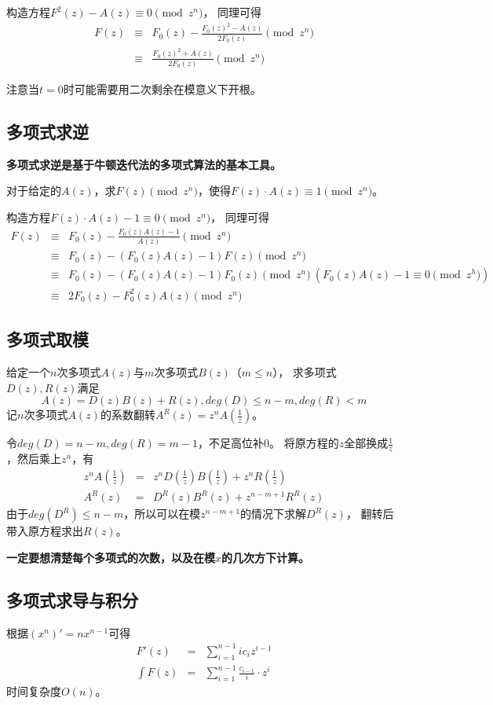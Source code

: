 构造方程$F^2(z)-A(z)\equiv 0\pmod{z^n}$，
同理可得
\begin{eqnarray*}
    F(z)&\equiv& F_0(z)-\frac{F_0(z)^2-A(z)}{2F_0(z)} \pmod{z^n}\\
    &\equiv& \frac{F_0(z)^2+A(z)}{2F_0(z)} \pmod{z^n}
\end{eqnarray*}

注意当$t=0$时可能需要用二次剩余在模意义下开根。

\subsection{多项式求逆}
{\bfseries 多项式求逆是基于牛顿迭代法的多项式算法的基本工具。}

对于给定的$A(z)$，求$F(z) \pmod{z^n}$，使得$F(z)\cdot A(z)\equiv 1\pmod{z^n}$。

构造方程$F(z)\cdot A(z)-1\equiv 0\pmod{z^n}$，
同理可得
\begin{eqnarray*}
    F(z)&\equiv& F_0(z)-\frac{F_0(z)A(z)-1}{A(z)} \pmod{z^n}\\
    &\equiv& F_0(z)-(F_0(z)A(z)-1){F(z)} \pmod{z^n}\\
    &\equiv& F_0(z)-(F_0(z)A(z)-1){F_0(z)} \pmod{z^n}~(F_0(z)A(z)-1\equiv 0\pmod{z^h})\\
    &\equiv& 2F_0(z)-F_0^2(z)A(z) \pmod{z^n}
\end{eqnarray*}
\subsection{多项式取模}
给定一个$n$次多项式$A(z)$与$m$次多项式$B(z)$（$m\leq n$），
求多项式$D(z),R(z)$满足
\begin{displaymath}
    A(z)=D(z)B(z)+R(z),deg(D)\leq n-m,deg(R)<m
\end{displaymath}
记$n$次多项式$A(z)$的系数翻转$A^R(z)=z^nA(\frac{1}{z})$。

令$deg(D)=n-m,deg(R)=m-1$，不足高位补0。
将原方程的$z$全部换成$\frac{1}{z}$，然后乘上$z^n$，有
\begin{eqnarray*}
    z^nA(\frac{1}{z})&=&z^nD(\frac{1}{z})B(\frac{1}{z})+z^nR(\frac{1}{z})\\
    A^R(z)&=&D^R(z)B^R(z)+z^{n-m+1}R^R(z)
\end{eqnarray*}
由于$deg(D^R)\leq n-m$，所以可以在模$z^{n-m+1}$的情况下求解$D^R(z)$，
翻转后带入原方程求出$R(z)$。

{\bfseries 一定要想清楚每个多项式的次数，以及在模$x$的几次方下计算。}
\subsection{多项式求导与积分}
根据$(x^n)'=nx^{n-1}$可得
\begin{eqnarray*}
    F'(z)&=&\sum_{i=1}^{n-1}{ic_iz^{i-1}}\\
    \int F(z)&=&\sum_{i=1}^{n-1}{\frac{c_{i-1}}{i}\cdot z^i}
\end{eqnarray*}
时间复杂度$O(n)$。
